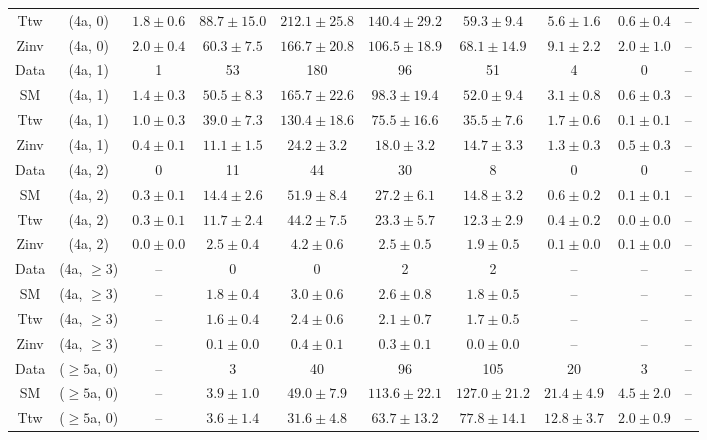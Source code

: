 \begin{table}[h!]
{\begin{tabular}{cccccccccc}
	Ttw & (4a, 0) & $1.8\pm 0.6$ & $88.7\pm 15.0$ & $212.1\pm 25.8$ & $140.4\pm 29.2$ & $59.3\pm 9.4$ & $5.6\pm 1.6$ & $0.6\pm 0.4$ & -- \\[0.5ex] 
	Zinv & (4a, 0) & $2.0\pm 0.4$ & $60.3\pm 7.5$ & $166.7\pm 20.8$ & $106.5\pm 18.9$ & $68.1\pm 14.9$ & $9.1\pm 2.2$ & $2.0\pm 1.0$ & -- \\[0.5ex] 
	Data & (4a, 1) & 1 & 53 & 180 & 96 & 51 & 4 & 0 & -- \\[0.5ex] 
	SM & (4a, 1) & $1.4\pm 0.3$ & $50.5\pm 8.3$ & $165.7\pm 22.6$ & $98.3\pm 19.4$ & $52.0\pm 9.4$ & $3.1\pm 0.8$ & $0.6\pm 0.3$ & -- \\[0.5ex] 
	Ttw & (4a, 1) & $1.0\pm 0.3$ & $39.0\pm 7.3$ & $130.4\pm 18.6$ & $75.5\pm 16.6$ & $35.5\pm 7.6$ & $1.7\pm 0.6$ & $0.1\pm 0.1$ & -- \\[0.5ex] 
	Zinv & (4a, 1) & $0.4\pm 0.1$ & $11.1\pm 1.5$ & $24.2\pm 3.2$ & $18.0\pm 3.2$ & $14.7\pm 3.3$ & $1.3\pm 0.3$ & $0.5\pm 0.3$ & -- \\[0.5ex] 
	Data & (4a, 2) & 0 & 11 & 44 & 30 & 8 & 0 & 0 & -- \\[0.5ex] 
	SM & (4a, 2) & $0.3\pm 0.1$ & $14.4\pm 2.6$ & $51.9\pm 8.4$ & $27.2\pm 6.1$ & $14.8\pm 3.2$ & $0.6\pm 0.2$ & $0.1\pm 0.1$ & -- \\[0.5ex] 
	Ttw & (4a, 2) & $0.3\pm 0.1$ & $11.7\pm 2.4$ & $44.2\pm 7.5$ & $23.3\pm 5.7$ & $12.3\pm 2.9$ & $0.4\pm 0.2$ & $0.0\pm 0.0$ & -- \\[0.5ex] 
	Zinv & (4a, 2) & $0.0\pm 0.0$ & $2.5\pm 0.4$ & $4.2\pm 0.6$ & $2.5\pm 0.5$ & $1.9\pm 0.5$ & $0.1\pm 0.0$ & $0.1\pm 0.0$ & -- \\[0.5ex] 
	Data & (4a, $\ge3$) & -- & 0 & 0 & 2 & 2 & -- & -- & -- \\[0.5ex] 
	SM & (4a, $\ge3$) & -- & $1.8\pm 0.4$ & $3.0\pm 0.6$ & $2.6\pm 0.8$ & $1.8\pm 0.5$ & -- & -- & -- \\[0.5ex] 
	Ttw & (4a, $\ge3$) & -- & $1.6\pm 0.4$ & $2.4\pm 0.6$ & $2.1\pm 0.7$ & $1.7\pm 0.5$ & -- & -- & -- \\[0.5ex] 
	Zinv & (4a, $\ge3$) & -- & $0.1\pm 0.0$ & $0.4\pm 0.1$ & $0.3\pm 0.1$ & $0.0\pm 0.0$ & -- & -- & -- \\[0.5ex] 
	Data & ($\ge5$a, 0) & -- & 3 & 40 & 96 & 105 & 20 & 3 & -- \\[0.5ex] 
	SM & ($\ge5$a, 0) & -- & $3.9\pm 1.0$ & $49.0\pm 7.9$ & $113.6\pm 22.1$ & $127.0\pm 21.2$ & $21.4\pm 4.9$ & $4.5\pm 2.0$ & -- \\[0.5ex] 
	Ttw & ($\ge5$a, 0) & -- & $3.6\pm 1.4$ & $31.6\pm 4.8$ & $63.7\pm 13.2$ & $77.8\pm 14.1$ & $12.8\pm 3.7$ & $2.0\pm 0.9$ & -- \\[0.5ex] 

\end{tabular}}
\end{table}
